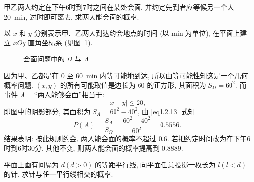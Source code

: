 \begin{example}[会商问题]
  甲乙两人约定在下午6时到7时之间在某处会面,
  并约定先到者应等候另一个人 \SI{20}{\minute},
  过时即可离去.
  求两人能会面的概率.
\end{example}

\begin{solution}
  以 $x$ 和 $y$ 分别表示甲、乙两人到达约会地点的时间 (以 \si{\minute} 为单位),
  在平面上建立 $xOy$ 直角坐标系 (见图~\ref{fig1.2.3}).

  \begin{figure}[!ht]
    \centering
    \caption{会面问题中的 $\Omega$ 与 $A$.}
    \label{fig1.2.3}
  \end{figure}

  因为甲、乙都是在 0 至 \SI{60}{\minute} 内等可能地到达,
  所以由等可能性知这是一个几何概率问题.
  $(x, y)$ 的所有可能取值是边长为 60 的正方形,
  其面积为 $S_\Omega = 60^2$.
  而事件 $A =$“两人能够会面”相当于:
  \[
    | x - y | \le 20,
  \]
  即图中的阴影部分,
  其面积为 $S_A = 60^2 - 40^2$,
  由 \eqref{eq1.2.13} 式知
  \[
    P (A) = \frac{S_A}{S_\Omega} = \frac{60^2 - 40^2}{60^2} = 0.5556.
  \]
  结果表明:
  按此规则约会,
  两人能会面的概率不超过 0.6.
  若把约定时间改为在下午6时到6时30分,
  其他不变,
  则两人能会面的概率提高到 \num{0.8889}.
\end{solution}

\begin{example}[蒲丰投针问题]
  平面上画有间隔为 $d (d > 0)$ 的等距平行线,
  向平面任意投掷一枚长为 $l (l<d)$ 的针,
  求针与任一平行线相交的概率.
\end{example}

